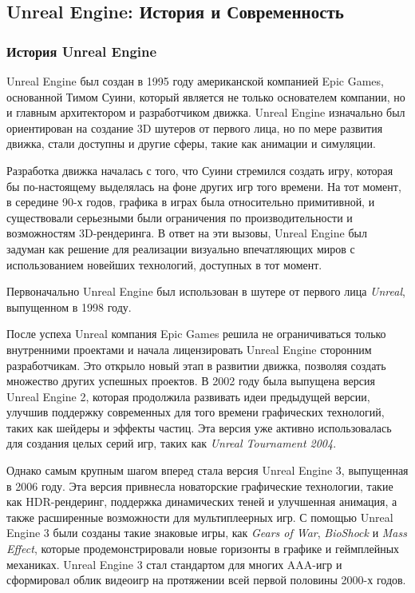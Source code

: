 
\subsection{Unreal Engine: История и Современность}

\subsubsection{История Unreal Engine}
Unreal Engine был создан в 1995 году американской компанией Epic Games, основанной Тимом Суини, который является не только основателем компании, но и главным архитектором и разработчиком движка. Unreal Engine изначально был ориентирован на создание 3D шутеров от первого лица, но по мере развития движка, стали доступны и другие сферы, такие как анимации и симуляции. \newline

Разработка движка началась с того, что Суини стремился создать игру, которая бы по-настоящему выделялась на фоне других игр того времени. На тот момент, в середине 90-х годов, графика в играх была относительно примитивной, и существовали серьезными были ограничения по производительности и возможностям 3D-рендеринга. В ответ на эти вызовы, Unreal Engine был задуман как решение для реализации визуально впечатляющих миров с использованием новейших технологий, доступных в тот момент. \newline

Первоначально Unreal Engine был использован в шутере от первого лица \textit{Unreal}, выпущенном в 1998 году.

После успеха Unreal компания Epic Games решила не ограничиваться только внутренними проектами и начала лицензировать Unreal Engine сторонним разработчикам. Это открыло новый этап в развитии движка, позволяя создать множество других успешных проектов. В 2002 году была выпущена версия Unreal Engine 2, которая продолжила развивать идеи предыдущей версии, улучшив поддержку современных для того времени графических технологий, таких как шейдеры и эффекты частиц. Эта версия уже активно использовалась для создания целых серий игр, таких как \textit{Unreal Tournament 2004}. \newline

Однако самым крупным шагом вперед стала версия Unreal Engine 3, выпущенная в 2006 году. Эта версия привнесла новаторские графические технологии, такие как HDR-рендеринг, поддержка динамических теней и улучшенная анимация, а также расширенные возможности для мультиплеерных игр. С помощью Unreal Engine 3 были созданы такие знаковые игры, как \textit{Gears of War}, \textit{BioShock} и \textit{Mass Effect}, которые продемонстрировали новые горизонты в графике и геймплейных механиках. Unreal Engine 3 стал стандартом для многих AAA-игр и сформировал облик видеоигр на протяжении всей первой половины 2000-х годов. \newline

